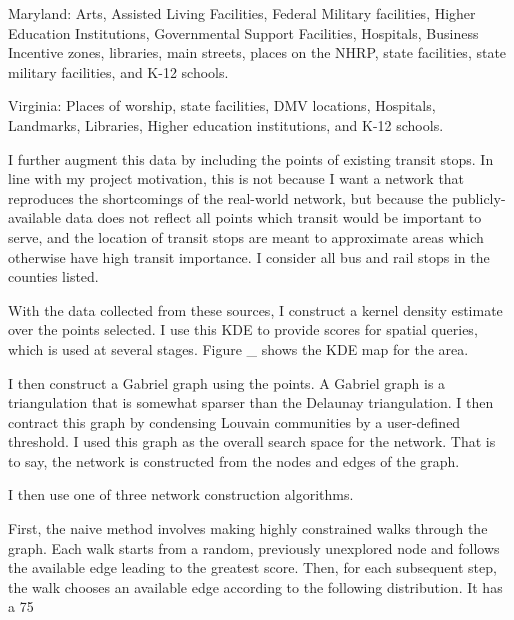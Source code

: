 \documentclass[manuscript,screen,review]{acmart}
\begin{document}
Maryland: Arts, Assisted Living Facilities, Federal Military facilities, Higher Education Institutions, Governmental Support Facilities, Hospitals, Business Incentive zones, libraries, main streets, places on the NHRP, state facilities, state military facilities, and K-12 schools.

Virginia: Places of worship, state facilities, DMV locations, Hospitals, Landmarks, Libraries, Higher education institutions, and K-12 schools.

I further augment this data by including the points of existing transit stops. In line with my project motivation, this is not because I want a network that reproduces the shortcomings of the real-world network, but because the publicly-available data does not reflect all points which transit would be important to serve, and the location of transit stops are meant to approximate areas which otherwise have high transit importance. I consider all bus and rail stops in the counties listed.

With the data collected from these sources, I construct a kernel density estimate over the points selected. I use this KDE to provide scores for spatial queries, which is used at several stages. Figure _ shows the KDE map for the area.

I then construct a Gabriel graph using the points. A Gabriel graph is a triangulation that is somewhat sparser than the Delaunay triangulation. I then contract this graph by condensing Louvain communities by a user-defined threshold. I used this graph as the overall search space for the network. That is to say, the network is constructed from the nodes and edges of the graph. 

I then use one of three network construction algorithms.

First, the naive method involves making highly constrained walks through the graph. Each walk starts from a random, previously unexplored node and follows the available edge leading to the greatest score. Then, for each subsequent step, the walk chooses an available edge according to the following distribution. It has a 75%
\end{document}
